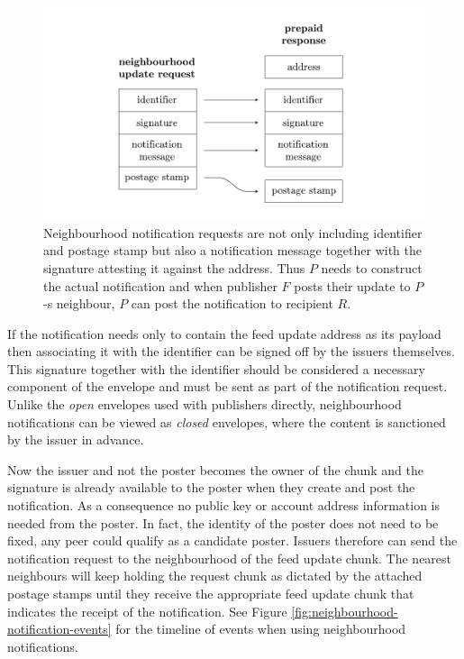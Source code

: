 \begin{figure}[htbp]
\centering
\includegraphics[width=\textwidth]{fig/notification-from-neighbourhood.pdf}
\caption[Neighbourhood notifications \statusgreen]{Neighbourhood notification requests are not only including identifier and postage stamp but also a notification message together with the signature attesting it against the address. Thus $P$ needs to construct the actual notification and when publisher $F$ posts their update to $P$-s neighbour, $P$ can post the notification to recipient $R$.}
\label{fig:notification-from-neighbourhood}
\end{figure}

If the notification needs only to contain the feed update address as its payload then associating it with the identifier can be signed off by the issuers themselves. This signature together with the identifier should be considered a necessary component of the envelope and must be sent as part of the notification request.
Unlike the \emph{open} envelopes used with publishers directly, neighbourhood notifications can be viewed as \emph{closed} envelopes, where the content is sanctioned by the issuer in advance. 

Now the issuer and not the poster becomes the owner of the chunk and the signature is already available to the poster when they create and post the notification. As a consequence no public key or account address information is needed from the poster. In fact, the identity of the poster does not need to be fixed, any peer could qualify as a candidate poster. Issuers therefore can send the notification request to the neighbourhood of the feed update chunk. The nearest neighbours will keep holding the request chunk as dictated by the attached postage stamps until they receive the appropriate feed update chunk that indicates the receipt of the notification. See Figure \ref{fig:neighbourhood-notification-events} for the timeline of events when using neighbourhood notifications.

